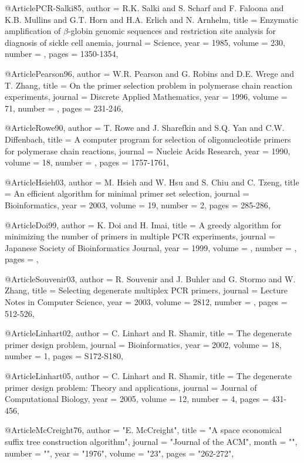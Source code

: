 @Article{PCR-Salki85,
  author = {R.K. Salki and S. Scharf and F. Faloona and K.B. Mullins and G.T. Horn and H.A. Erlich and N. Arnhelm},
  title =  {Enzymatic amplification of $\beta$-globin genomic sequences and restriction site analysis for diagnosis of sickle cell anemia},
  journal = {Science},
  year = {1985},
  volume =  {230},
  number =  {},
  pages =   {1350-1354},
}

@Article{Pearson96,
  author = {W.R. Pearson and G. Robins and D.E. Wrege and T. Zhang},
  title =  {On the primer selection problem in polymerase chain reaction experiments},
  journal = {Discrete Applied Mathematics},
  year = {1996},
  volume =  {71},
  number =  {},
  pages =   {231-246},
}

@Article{Rowe90,
  author = {T. Rowe and J. Sharefkin and S.Q. Yan and C.W. Diffenbach},
  title =  {A computer program for selection of oligonucleotide primers for polymerase chain reactions},
  journal = {Nucleic Acids Research},
  year = {1990},
  volume =  {18},
  number =  {},
  pages =   {1757-1761},
}

@Article{Hsieh03,
  author = {M. Hsieh and W. Hsu and S. Chiu and C. Tzeng},
  title =  {An efficient algorithm for minimal primer set selection},
  journal = {Bioinformatics},
  year = {2003},
  volume =  {19},
  number =  {2},
  pages =   {285-286},
}

@Article{Doi99,
  author = {K. Doi and H. Imai},
  title =  {A greedy algorithm for minimizing the number of primers in multiple {PCR} experiments},
  journal = {Japanese Society of Bioinformatics Journal},
  year = {1999},
  volume =  {},
  number =  {},
  pages =   {},
}

@Article{Souvenir03,
  author = {R. Souvenir and J. Buhler and G. Stormo and W. Zhang},
  title =  {Selecting degenerate multiplex {PCR} primers},
  journal = {Lecture Notes in Computer Science},
  year = {2003},
  volume =  {2812},
  number =  {},
  pages =   {512-526},
}

@Article{Linhart02,
  author = {C. Linhart and R. Shamir},
  title =  {The degenerate primer design problem},
  journal = {Bioinformatics},
  year = {2002},
  volume =  {18},
  number =  {1},
  pages =   {S172-S180},
}

@Article{Linhart05,
  author = {C. Linhart and R. Shamir},
  title =  {{The degenerate primer design problem: Theory and applications}},
  journal = {Journal of Computational Biology},
  year = {2005},
  volume =  {12},
  number =  {4},
  pages =   {431-456},
}

@Article{McCreight76,
   author =   "E. McCreight",
   title =   "A space economical suffix tree construction algorithm",
   journal =   "Journal of the ACM",
   month = "",
   number = "",
   year =   "1976",
   volume =   "23",
   pages =   "262-272",
}



